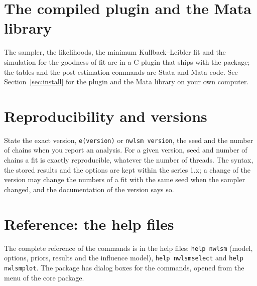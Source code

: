 \section{The compiled plugin and the Mata library}

The sampler, the likelihoods, the minimum Kullback--Leibler fit and the simulation for the goodness of fit are in a C plugin that ships with the package; the tables and the post-estimation commands are Stata and Mata code. See Section~\ref{sec:install} for the plugin and the Mata library on your own computer.

\section{Reproducibility and versions}

State the exact version, \texttt{e(version)} or \texttt{nwlsm version}, the seed and the number of chains when you report an analysis. For a given version, seed and number of chains a fit is exactly reproducible, whatever the number of threads. The syntax, the stored results and the options are kept within the series 1.x; a change of the version may change the numbers of a fit with the same seed when the sampler changed, and the documentation of the version says so.

\section{Reference: the help files}

The complete reference of the commands is in the help files: \texttt{help nwlsm} (model, options, priors, results and the influence model), \texttt{help nwlsmselect} and \texttt{help nwlsmplot}. The package has dialog boxes for the commands, opened from the menu of the core package.
